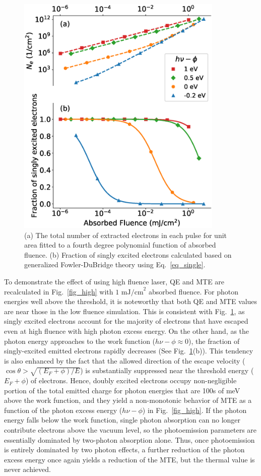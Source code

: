 \begin{figure}
	\centering
	\includegraphics*[width=280pt]{figs/boltzmann/single.eps}
	\caption{(a) The total number of extracted electrons in each pulse for unit area fitted to a fourth degree polynomial function of absorbed fluence. (b) Fraction of singly excited electrons calculated based on generalized Fowler-DuBridge theory using Eq.~\ref{eq_single}.}
	\label{fig_single}
\end{figure}

To demonstrate the effect of using high fluence laser, QE and MTE are recalculated in Fig.~\ref{fig_high} with  $1 \textrm{ mJ/cm}^2$ absorbed fluence. For photon energies well above the threshold, it is noteworthy that both QE and MTE values are near those in the low fluence simulation. This is consistent with Fig.~\ref{fig_single}, as singly excited electrons account for the majority of electrons that have escaped even at high fluence with high photon excess energy.
On the other hand, as the photon energy approaches to the work function ($h\nu - \phi \approx 0$), the fraction of singly-excited emitted electrons rapidly decreases (See Fig.~\ref{fig_single}(b)). This tendency is also enhanced by the fact that the allowed direction of the escape velocity ($ \cos\theta > \sqrt{(E_F + \phi)/E}$) is substantially suppressed near the threshold energy ($E_F + \phi$) of electrons.
Hence, doubly excited electrons occupy non-negligible portion of the total emitted charge for photon energies that are 100s of meV above the work function, and they yield a non-monotonic behavior of MTE as a function of the photon excess energy ($h\nu - \phi$) in Fig.~\ref{fig_high}.
If the photon energy falls below the work function, single photon absorption can no longer contribute electrons above the vacuum level, so the photoemission parameters are essentially dominated by two-photon absorption alone. Thus, once photoemission is entirely dominated by two photon effects, a further reduction of the photon excess energy once again yields a reduction of the MTE, but the thermal value is never achieved.

